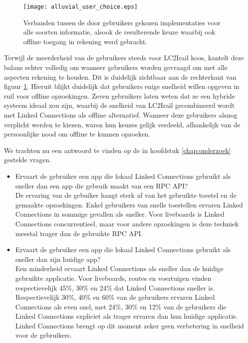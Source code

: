 \begin{figure}[ht]
	\centering
	\texttt{[image: alluvial\_user\_choice.eps]}
	\caption[Door gebruikers gekozen implementatie]{Verbanden tussen de door gebruikers gekozen implementaties voor alle soorten informatie, alsook de resulterende keuze waarbij ook offline toegang in rekening werd gebracht. }
	\label{fig:alluvialUserChoices}
\end{figure}

Terwijl de meerderheid van de gebruikers steeds voor LC2Irail koos, kantelt deze balans echter volledig om wanneer gebruikers worden gevraagd om met alle aspecten rekening te houden. Dit is duidelijk zichtbaar aan de rechterkant van figuur \ref{fig:alluvialUserChoices}. Hieruit blijkt duidelijk dat gebruikers enige snelheid willen opgeven in ruil voor offline opzoekingen. Zeven gebruikers laten weten dat ze een hybride systeem ideaal zou zijn, waarbij de snelheid van LC2Irail gecombineerd wordt met Linked Connections als offline alternatief. Wanneer deze gebruikers alsnog verplicht werden te kiezen, waren hun keuzes gelijk verdeeld, afhankelijk van de persoonlijke nood om offline te kunnen opzoeken. 


We trachten nu een antwoord te vinden op de in hoofdstuk \ref{chap:onderzoek} gestelde vragen.
\begin{itemize}
	\item Ervaart de gebruiker een app die lokaal Linked Connections gebruikt als sneller dan een app die gebruik maakt van een RPC API?\\
	De ervaring van de gebuiker hangt sterk af van het gebruikte toestel en de gemaakte opzoekingen. Enkel gebruikers van snelle toestellen ervaren Linked Connections in sommige gevallen als sneller. Voor liveboards is Linked Connections concurrentieel, maar voor andere opzoekingen is deze techniek meestal trager dan de gebruikte RPC API.
	\item Ervaart de gebruiker een app die lokaal Linked Connections gebruikt als sneller dan zijn huidige app?\\
	Een minderheid ervaart Linked Connections als sneller dan de huidige gebruikte applicatie. Voor liveboards, routes en voertuigen vinden respectievelijk 45\%, 30\% en 24\% dat Linked Connections sneller is. Respectievelijk 30\%, 40\% en 60\% van de gebruikers ervaren Linked Connections als even snel, met 24\%, 30\% en 12\% van de gebruikers die Linked Connections expliciet als trager ervaren dan hun huidige applicatie. Linked Connections brengt op dit moment zeker geen verbetering in snelheid voor de gebruikers.
\end{itemize}

